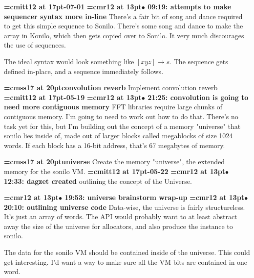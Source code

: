 {\medskip\noindent\bf\font\titlefont=cmitt12 at 17pt-07-01}\medskip
{\smallskip\noindent\bf\font\titlefont=cmr12 at 13pt\titlefont $\bullet$ 09:19: attempts to make sequencer syntax more in-line}\smallskip
There's a fair bit of song and dance required to get this simple sequence to Sonilo. There's some song and dance to make the array in Konilo, which then gets copied over to Sonilo. It very much discourages the use of sequences.
\par

The ideal syntax would look something like $[x y z] \to s$. The sequence gets defined in-place, and a sequence immediately follows.
\par

{\medskip\noindent\bf\font\titlefont=cmss17 at 20pt\titlefont convolution reverb}\medskip
Implement convolution reverb
{\medskip\noindent\bf\font\titlefont=cmitt12 at 17pt-05-19}\medskip
{\smallskip\noindent\bf\font\titlefont=cmr12 at 13pt\titlefont $\bullet$ 21:25: convolution is going to need more contiguous memory}\smallskip
FFT libraries require large chunks of contiguous memory. I'm going to need to work out how to do that. There's no task yet for this, but I'm building out the concept of a memory "universe" that sonilo lies inside of, made out of larger blocks called megablocks of size 1024 words. If each block has a 16-bit address, that's 67 megabytes of memory.
\par

{\medskip\noindent\bf\font\titlefont=cmss17 at 20pt\titlefont universe}\medskip
Create the memory "universe", the extended memory for
the sonilo VM.
{\medskip\noindent\bf\font\titlefont=cmitt12 at 17pt-05-22}\medskip
{\smallskip\noindent\bf\font\titlefont=cmr12 at 13pt\titlefont $\bullet$ 12:33: dagzet created}\smallskip
outlining the concept of the Universe.
\par

{\smallskip\noindent\bf\font\titlefont=cmr12 at 13pt\titlefont $\bullet$ 19:53: universe brainstorm wrap-up}\smallskip
{\smallskip\noindent\bf\font\titlefont=cmr12 at 13pt\titlefont $\bullet$ 20:10: outlining universe code}\smallskip
Data-wise, the universe is fairly structureless. It's just an array of words. The API would probably want to at least abstract away the size of the universe for allocators, and also produce the instance to sonilo.
\par

The data for the sonilo VM should be contained inside of the universe. This could get interesting. I'd want a way to make sure all the VM bits are contained in one word.
\par


